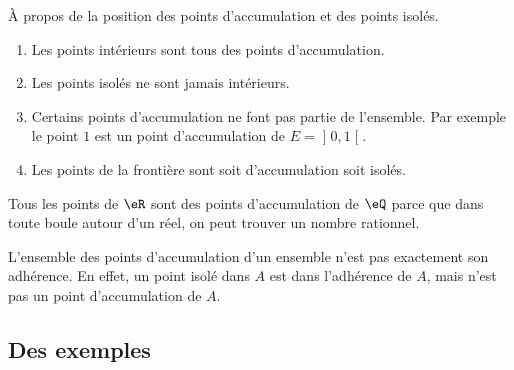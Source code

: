 \begin{remark}
	À propos de la position des points d'accumulation et des points isolés.
	\begin{enumerate}
		\item
		      Les points intérieurs sont tous des points d'accumulation.
		\item
		      Les points isolés ne sont jamais intérieurs.
		\item
		      Certains points d'accumulation ne font pas partie de l'ensemble. Par exemple le point \( 1\) est un point d'accumulation de \( E=\mathopen] 0 , 1 \mathclose[\).
		\item
		      Les points de la frontière sont soit d'accumulation soit isolés.
	\end{enumerate}
\end{remark}

\begin{example}
	Tous les points de \( \eR\) sont des points d'accumulation de \( \eQ\) parce que dans toute boule autour d'un réel, on peut trouver un nombre rationnel.
\end{example}

\begin{remark}
	L'ensemble des points d'accumulation d'un ensemble n'est pas exactement son adhérence. En effet, un point isolé dans \( A\) est dans l'adhérence de \( A\), mais n'est pas un point d'accumulation de \( A\).
\end{remark}

\subsection{Des exemples}


